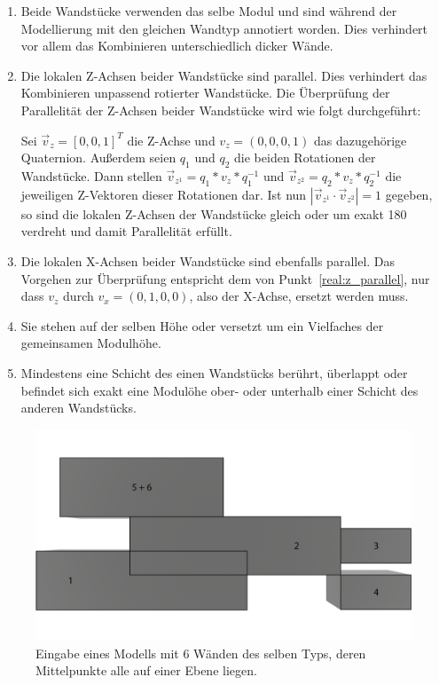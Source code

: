 \begin{enumerate}
    \item Beide Wandstücke verwenden das selbe Modul und sind während der Modellierung mit den gleichen Wandtyp annotiert worden. 
    Dies verhindert vor allem das Kombinieren unterschiedlich dicker Wände.
    \item\label{real:z_parallel} Die lokalen Z-Achsen beider Wandstücke sind parallel. 
    Dies verhindert das Kombinieren unpassend rotierter Wandstücke.
    Die Überprüfung der Parallelität der Z-Achsen beider Wandstücke wird wie folgt durchgeführt:

    Sei \(\vec{v}_z = {[0, 0, 1]}^T\)
    die Z-Achse und \(v_z = (0, 0, 0, 1)\) das dazugehörige Quaternion. 
    Außerdem seien \(q_1\) und \(q_2\) die beiden Rotationen der Wandstücke. Dann stellen 
    \(\vec{v}_{z^1} = q_1 * v_z * q_1^{-1}\) und 
    \(\vec{v}_{z^2} = q_2 * v_z * q_2^{-1}\) die jeweiligen \glqq{}Z-Vektoren\grqq{} dieser Rotationen dar.
    Ist nun \(|\vec{v}_{z^1} \cdot \vec{v}_{z^2}| = 1\) gegeben, so sind die lokalen Z-Achsen der Wandstücke gleich oder um exakt 180\degree{} verdreht und damit Parallelität erfüllt.
    \item Die lokalen X-Achsen beider Wandstücke sind ebenfalls parallel. Das Vorgehen zur Überprüfung entspricht dem von Punkt~\ref{real:z_parallel}, nur dass \(v_z\) durch \(v_x = (0, 1, 0, 0)\), also der X-Achse, ersetzt werden muss.
    \item Sie stehen auf der selben Höhe oder versetzt um ein Vielfaches der gemeinsamen Modulhöhe.
    \item\label{real:schichten} Mindestens eine Schicht des einen Wandstücks berührt, überlappt oder befindet sich exakt eine Modulöhe ober- oder unterhalb einer Schicht des anderen Wandstücks.
\end{enumerate}

\begin{figure}[ht]
  \centering
  \includegraphics[width=0.8\columnwidth]{fig/Real_Combination_Base_labeled.png}
  \caption{Eingabe eines Modells mit 6 Wänden des selben Typs, deren Mittelpunkte alle auf einer Ebene liegen.}
  \label{fig:real:combination_example_base}
\end{figure}

